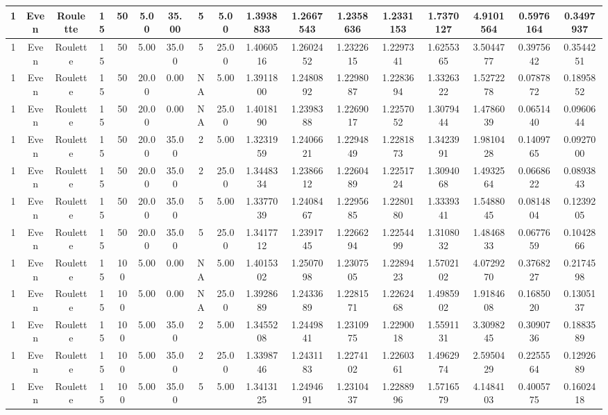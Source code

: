 \documentclass[a4paper]{article}
\begin{document}
\begin{center}
\begin{tabular}{ | c | c | c | c | c | c | c | c | c | c | c | c | c | c | c | c | c | }
		\hline
		1	&	Even	&	Roulette	&	15	&	50	&	5.00	&	35.00	&	5	&	5.00	&	1.3938833	&	1.2667543	&	1.2358636	&	1.2331153	&	1.7370127	&	4.9101564	&	0.5976164	&	0.3497937 \\
		\hline
		1	&	Even	&	Roulette	&	15	&	50	&	5.00	&	35.00	&	5	&	25.00	&	1.4060516	&	1.2602452	&	1.2322615	&	1.2297341	&	1.6255365	&	3.5044777	&	0.3975642	&	0.3544251 \\
		\hline
		1	&	Even	&	Roulette	&	15	&	50	&	20.00	&	0.00	&	NA	&	5.00	&	1.3911800	&	1.2480892	&	1.2298087	&	1.2283694	&	1.3326322	&	1.5272278	&	0.0787872	&	0.1895852 \\
		\hline
		1	&	Even	&	Roulette	&	15	&	50	&	20.00	&	0.00	&	NA	&	25.00	&	1.4018190	&	1.2398388	&	1.2269017	&	1.2257052	&	1.3079444	&	1.4786039	&	0.0651440	&	0.0960644 \\
		\hline
		1	&	Even	&	Roulette	&	15	&	50	&	20.00	&	35.00	&	2	&	5.00	&	1.3231959	&	1.2406621	&	1.2294849	&	1.2281873	&	1.3423991	&	1.9810428	&	0.1409765	&	0.0927000 \\
		\hline
		1	&	Even	&	Roulette	&	15	&	50	&	20.00	&	35.00	&	2	&	25.00	&	1.3448334	&	1.2386612	&	1.2260489	&	1.2251724	&	1.3094068	&	1.4932564	&	0.0668622	&	0.0893843 \\
		\hline
		1	&	Even	&	Roulette	&	15	&	50	&	20.00	&	35.00	&	5	&	5.00	&	1.3377039	&	1.2408467	&	1.2295685	&	1.2280180	&	1.3339341	&	1.5488045	&	0.0814804	&	0.1239205 \\
		\hline
		1	&	Even	&	Roulette	&	15	&	50	&	20.00	&	35.00	&	5	&	25.00	&	1.3417712	&	1.2391745	&	1.2266294	&	1.2254499	&	1.3108032	&	1.4846833	&	0.0677659	&	0.1042866 \\
		\hline
		1	&	Even	&	Roulette	&	15	&	100	&	5.00	&	0.00	&	NA	&	5.00	&	1.4015302	&	1.2507098	&	1.2307505	&	1.2289423	&	1.5702102	&	4.0729270	&	0.3768227	&	0.2174598 \\
		\hline
		1	&	Even	&	Roulette	&	15	&	100	&	5.00	&	0.00	&	NA	&	25.00	&	1.3928689	&	1.2433689	&	1.2281571	&	1.2262468	&	1.4985902	&	1.9184608	&	0.1685020	&	0.1305137 \\
		\hline
		1	&	Even	&	Roulette	&	15	&	100	&	5.00	&	35.00	&	2	&	5.00	&	1.3455208	&	1.2449841	&	1.2310975	&	1.2290018	&	1.5591131	&	3.3098245	&	0.3090736	&	0.1883589 \\
		\hline
		1	&	Even	&	Roulette	&	15	&	100	&	5.00	&	35.00	&	2	&	25.00	&	1.3398746	&	1.2431183	&	1.2274102	&	1.2260361	&	1.4962974	&	2.5950429	&	0.2255564	&	0.1292689 \\
		\hline
		1	&	Even	&	Roulette	&	15	&	100	&	5.00	&	35.00	&	5	&	5.00	&	1.3413125	&	1.2494691	&	1.2310437	&	1.2288996	&	1.5716579	&	4.1484103	&	0.4005775	&	0.1602418 \\

\end{tabular}
\end{center}
\end{document}
